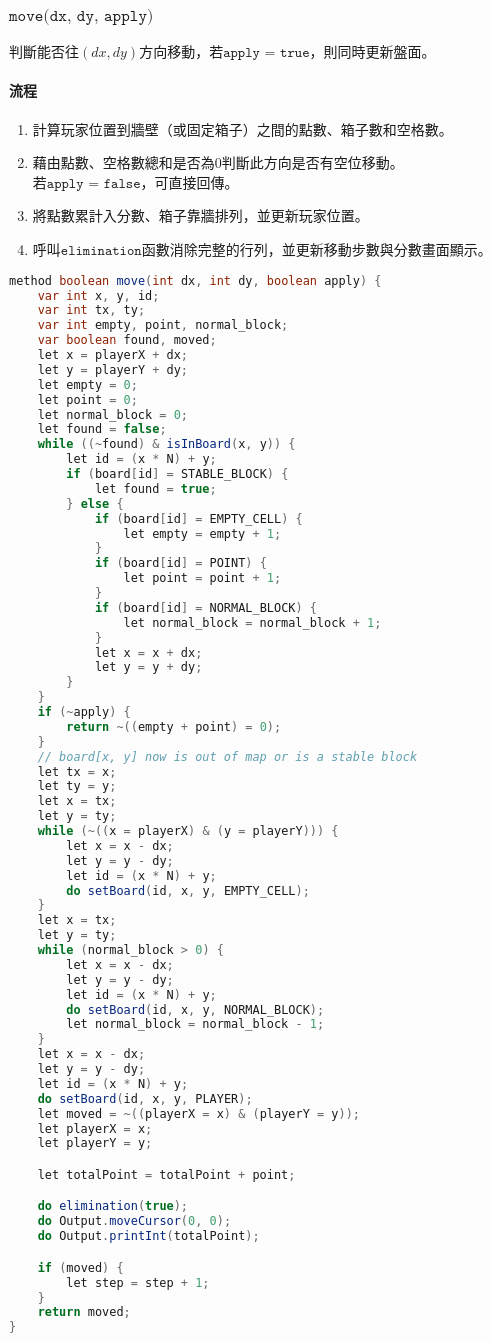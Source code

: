 \documentclass[pstricks, 12pt, a4paper]{article}
\begin{document}
    \subsubsection{$\texttt{move(dx, dy, apply)}$}
      判斷能否往$(dx, dy)$方向移動，若$\texttt{apply = true}$，則同時更新盤面。
      \paragraph{流程}
      \begin{enumerate}
        \item 計算玩家位置到牆壁（或固定箱子）之間的點數、箱子數和空格數。
        \item 藉由點數、空格數總和是否為0判斷此方向是否有空位移動。\\若$\texttt{apply = false}$，可直接回傳。
        \item 將點數累計入分數、箱子靠牆排列，並更新玩家位置。
        \item 呼叫$\texttt{elimination}$函數消除完整的行列，並更新移動步數與分數畫面顯示。
      \end{enumerate}
      \begin{lstlisting}[language=Java, frame=single]
method boolean move(int dx, int dy, boolean apply) {
    var int x, y, id;
    var int tx, ty;
    var int empty, point, normal_block;
    var boolean found, moved;
    let x = playerX + dx;
    let y = playerY + dy;
    let empty = 0;
    let point = 0;
    let normal_block = 0;
    let found = false;
    while ((~found) & isInBoard(x, y)) {
        let id = (x * N) + y;
        if (board[id] = STABLE_BLOCK) {
            let found = true;
        } else {
            if (board[id] = EMPTY_CELL) {
                let empty = empty + 1;
            }
            if (board[id] = POINT) {
                let point = point + 1;
            }
            if (board[id] = NORMAL_BLOCK) {
                let normal_block = normal_block + 1;
            }
            let x = x + dx;
            let y = y + dy;
        }
    }
    if (~apply) {
        return ~((empty + point) = 0);
    }
    // board[x, y] now is out of map or is a stable block
    let tx = x;
    let ty = y;
    let x = tx;
    let y = ty;
    while (~((x = playerX) & (y = playerY))) {
        let x = x - dx;
        let y = y - dy;
        let id = (x * N) + y;
        do setBoard(id, x, y, EMPTY_CELL);
    }
    let x = tx;
    let y = ty;
    while (normal_block > 0) {
        let x = x - dx;
        let y = y - dy;
        let id = (x * N) + y;
        do setBoard(id, x, y, NORMAL_BLOCK);
        let normal_block = normal_block - 1;
    }
    let x = x - dx;
    let y = y - dy;
    let id = (x * N) + y;
    do setBoard(id, x, y, PLAYER);
    let moved = ~((playerX = x) & (playerY = y));
    let playerX = x;
    let playerY = y;

    let totalPoint = totalPoint + point;

    do elimination(true);
    do Output.moveCursor(0, 0);
    do Output.printInt(totalPoint);

    if (moved) {
        let step = step + 1;
    }
    return moved;
}
      \end{lstlisting}
\end{document}
